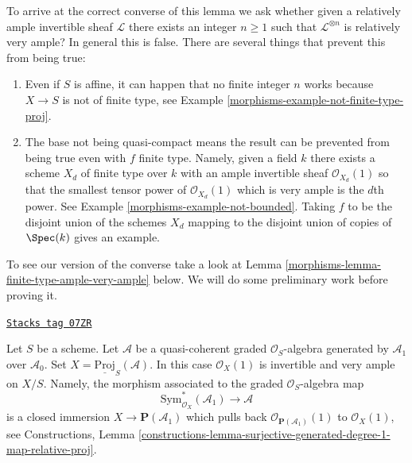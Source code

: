 To arrive at the correct converse of this lemma we ask
whether given a relatively ample
invertible sheaf $\mathcal{L}$ there exists an integer $n \geq 1$ such
that $\mathcal{L}^{\otimes n}$ is relatively very ample? In general this
is false. There are several things that prevent this from being true:
\begin{enumerate}
\item Even if $S$ is affine, it can happen that no finite integer
$n$ works because $X \to S$ is not of finite type, see
Example \ref{morphisms-example-not-finite-type-proj}.
\item The base not being quasi-compact means the result can be
prevented from being true even with $f$ finite type. Namely, given
a field $k$ there exists a scheme $X_d$ of finite type over $k$ with
an ample invertible sheaf $\mathcal{O}_{X_d}(1)$ so that the smallest
tensor power of $\mathcal{O}_{X_d}(1)$ which is very ample is the $d$th
power. See Example \ref{morphisms-example-not-bounded}.
Taking $f$ to be the disjoint union of the schemes $X_d$ mapping
to the disjoint union of copies of $\Spec(k)$ gives an example.
\end{enumerate}
To see our version of the converse take a look at
Lemma \ref{morphisms-lemma-finite-type-ample-very-ample} below.
We will do some preliminary work before proving it.

\begin{example}
\label{morphisms-example-very-ample}
\href{https://stacks.math.columbia.edu/tag/07ZR}{\texttt{Stacks tag 07ZR}}

Let $S$ be a scheme. Let $\mathcal{A}$ be a quasi-coherent graded
$\mathcal{O}_S$-algebra generated by $\mathcal{A}_1$ over $\mathcal{A}_0$.
Set $X = \underline{\text{Proj}}_S(\mathcal{A})$. In this case
$\mathcal{O}_X(1)$ is invertible and very ample on $X/S$. Namely,
the morphism associated to the graded $\mathcal{O}_S$-algebra map
$$
\text{Sym}_{\mathcal{O}_X}^*(\mathcal{A}_1)
\longrightarrow
\mathcal{A}
$$
is a closed immersion $X \to \mathbf{P}(\mathcal{A}_1)$ which pulls back
$\mathcal{O}_{\mathbf{P}(\mathcal{A}_1)}(1)$ to $\mathcal{O}_X(1)$, see
Constructions, Lemma
\ref{constructions-lemma-surjective-generated-degree-1-map-relative-proj}.
\end{example}

